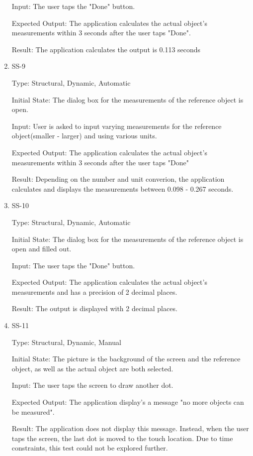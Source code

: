 \documentclass[12pt, titlepage]{article}
\begin{document}
\begin{enumerate}
Input: The user taps the "Done" button.

Expected Output: The application calculates the actual object's measurements within 3 seconds after the user taps "Done".

Result: The application calculates the output is 0.113 seconds

\item{SS-9\\}

Type: Structural, Dynamic, Automatic

Initial State: The dialog box for the measurements of the reference object is open.

Input: User is asked to input varying measurements for the reference object(smaller - larger) and using various units.

Expected Output: The application calculates the actual object's measurements within 3 seconds after the user taps "Done"

Result: Depending on the number and unit converion, the application calculates and displays the measurements between 0.098 - 0.267 seconds.

\item{SS-10\\}

Type: Structural, Dynamic, Automatic

Initial State: The dialog box for the measurements of the reference object is open and filled out.

Input: The user taps the "Done" button.

Expected Output: The application calculates the actual object's measurements and has a precision of 2 decimal places.

Result: The output is displayed with 2 decimal places.

\item{SS-11\\}

Type: Structural, Dynamic, Manual

Initial State: The picture is the background of the screen and the reference object, as well as the actual object are both selected.

Input: The user taps the screen to draw another dot.

Expected Output: The application display's a message "no more objects can be measured".

Result: The application does not display this message. Instead, when the user taps the screen, the last dot is moved to the touch location. Due to time constraints, this test could not be explored further.


\end{enumerate}
\end{document}
